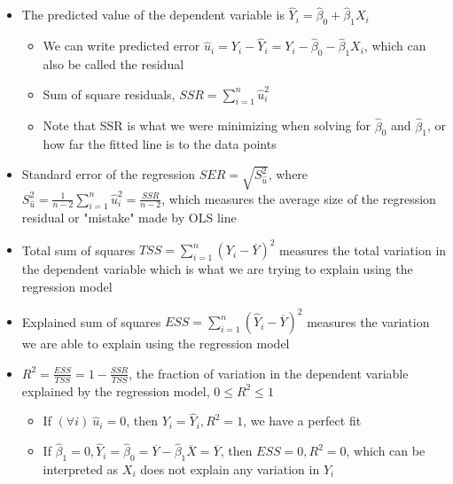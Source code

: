 \documentclass{article}
\begin{document}
\begin{itemize}
\begin{itemize}
        \item The procedure is the same as the population mean test we discussed before
        \begin{itemize}
            \item Set $t$-statistic $= \frac{\hat{\beta}_1 - \gamma}{SE[\hat{\beta}_1]} \sim \mathcal{N}(0,1)$ under $H_0$
            \item For 5\% significance level, reject $H_0$ if $\vert t\text{-statistic} \vert > 1.96$
        \end{itemize}
    \end{itemize}
    \item The predicted value of the dependent variable is $\hat{Y}_i = \hat{\beta}_0 + \hat{\beta}_1 X_i$
    \begin{itemize}
        \item We can write predicted error $\hat{u}_i = Y_i - \hat{Y}_i = Y_i - \hat{\beta}_0 - \hat{\beta}_1 X_i$, which can also be called the residual
        \item Sum of square residuals, $SSR = \sum_{i=1}^n \hat{u}_i^2$
        \item Note that SSR is what we were minimizing when solving for $\hat{\beta}_0$ and $\hat{\beta}_1$, or how far the fitted line is to the data points
    \end{itemize}
    \item Standard error of the regression $SER = \sqrt{S_{\hat{u}}^2}$, where $S_{\hat{u}}^2 = \frac{1}{n-2} \sum_{i=1}^n \hat{u}_i^2 = \frac{SSR}{n-2}$, which measures the average size of the regression residual or "mistake" made by OLS line
    \item Total sum of squares $TSS = \sum_{i=1}^n (Y_i - \overline{Y})^2$ measures the total variation in the dependent variable which is what we are trying to explain using the regression model
    \item Explained sum of squares $ESS = \sum_{i=1}^n (\hat{Y}_i - \overline{Y})^2$ measures the variation we are able to explain using the regression model
    \item $R^2 = \frac{ESS}{TSS} = 1 - \frac{SSR}{TSS}$, the fraction of variation in the dependent variable explained by the regression model, $0 \le R^2 \le 1$
    \begin{itemize}
        \item  If $(\forall i) \ \hat{u}_i = 0$, then $Y_i = \hat{Y}_i, R^2 = 1$, we have a perfect fit
        \item If $\hat{\beta}_1 = 0, \hat{Y}_i = \hat{\beta}_0 = \overline{Y} - \hat{\beta}_1 \overline{X} = \overline{Y}$, then $ESS = 0, R^2 = 0$, which can be interpreted as $X_i$ does not explain any variation in $Y_i$

\end{itemize}
\end{itemize}
\end{document}
